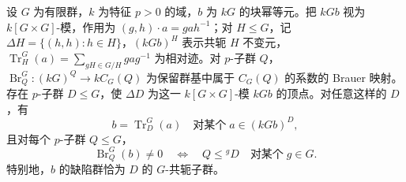 \begin{theorem}\label{b5:thm:defect-vertices-traces}
	设 \(G\) 为有限群，\(k\) 为特征 \(p>0\) 的域，\(b\) 为 \(kG\) 的块幂等元。把 \(kGb\) 视为 \(k[G\times G]\)-模，作用为 \((g,h)\cdot a=gah^{-1}\)；对 \(H\le G\)，记 \(\Delta H=\{(h,h):h\in H\}\)，\((kGb)^H\) 表示共轭 \(H\) 不变元，\(\operatorname{Tr}_H^G(a)=\sum_{gH\in G/H}gag^{-1}\) 为相对迹。对 \(p\)-子群 \(Q\)，\(\operatorname{Br}_Q^G:(kG)^Q\to kC_G(Q)\) 为保留群基中属于 \(C_G(Q)\) 的系数的 Brauer 映射。存在 \(p\)-子群 \(D\le G\)，使 \(\Delta D\) 为这一 \(k[G\times G]\)-模 \(kGb\) 的顶点。对任意这样的 \(D\)，有
	\[
		b=\operatorname{Tr}_D^G(a)\quad\text{对某个}\;a\in(kGb)^D,
	\]
	且对每个 \(p\)-子群 \(Q\le G\)，
	\[
		\operatorname{Br}_Q^G(b)\ne0
		\quad\Longleftrightarrow\quad
		Q\le {}^gD\quad\text{对某个}\;g\in G.
	\]
	特别地，\(b\) 的缺陷群恰为 \(D\) 的 \(G\)-共轭子群。
\end{theorem}
